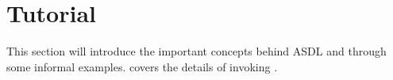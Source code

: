 %
\chapter{Tutorial}
\label{chap:tutorial}

This section will introduce the important concepts behind ASDL and
\asdlgen{} through some informal examples.
 covers the details of invoking
\asdlgen{}.

\begin{quote}
  
\end{quote}%

\begin{quote}
  
\end{quote}%

\begin{quote}
  
\end{quote}%

\begin{quote}
  
\end{quote}%

\begin{quote}
  
\end{quote}%

\begin{quote}
  
\end{quote}%
